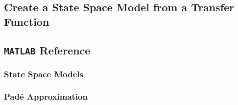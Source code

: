 \subsection{Create a State Space Model from a Transfer Function}

\subsection{\texttt{MATLAB} Reference}

\subsubsection{State Space Models}

\subsubsection{Padé Approximation}
